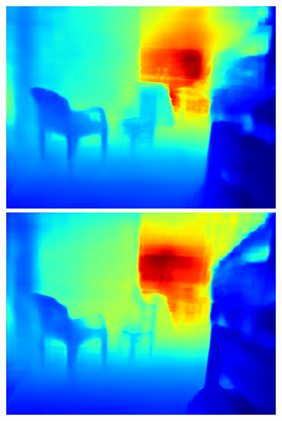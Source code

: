 \begin{figure}[htb]
\begin{subfigure}{0.15\linewidth}
\begin{minipage}[t]{1\linewidth}
  \includegraphics[width=1\linewidth]{figure/nyu_result/bedroom_rgb_01078.png}
  \includegraphics[width=1\linewidth]{figure/nyu_without/bedroom_rgb_01078.png}
  \end{minipage}%
  \end{subfigure}
  \begin{subfigure}{0.15\linewidth}
    

\end{subfigure}
\end{figure}
